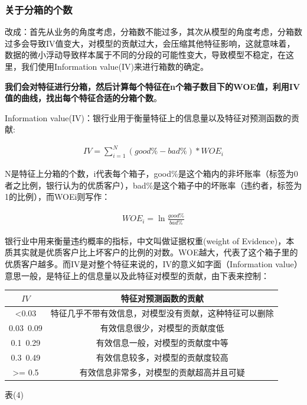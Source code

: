 \documentclass[12pt]{article}
\begin{document}
\subsubsection{关于分箱的个数}
\begin{flushleft}
	\noindent\qquad 改成：首先从业务的角度考虑，分箱数不能过多，其次从模型的角度考虑，分箱数过多会导致IV值变大，对模型的贡献过大，会压缩其他特征影响，这就意味着，数据的微小浮动导致样本属于不同的分段的可能性变大，导致模型不稳定，在这里，我们使用Information value(IV)来进行箱数的确定。\par
	\noindent\qquad \textbf{我们会对特征进行分箱，然后计算每个特征在n个箱子数目下的WOE值，利用IV值的曲线，找出每个特征合适的分箱个数}。\par
	\noindent\qquad Information value(IV)：银行业用于衡量特征上的信息量以及特征对预测函数的贡献:
	
\end{flushleft}
\begin{align}
IV=\sum_{i=1}^N (good\%-bad\%)*WOE_i\tag{1}
\end{align}

\begin{flushleft}
	\noindent\qquad N是特征上分箱的个数，i代表每个箱子，good$\%$是这个箱内的非坏账率（标签为0者之比例，银行认为的优质客户），bad$\%$是这个箱子中的坏账率（违约者，标签为1的比例），而WOEi则写作：
\end{flushleft}

\begin{align}\nonumber %
WOE_i=\ln\frac{good\%}{bad\%} \tag{2}
\end{align}

\begin{flushleft}
	\noindent\qquad 银行业中用来衡量违约概率的指标，中文叫做证据权重(weight of Evidence)，本质其实就是优质客户比上坏客户的比例的对数。WOE越大，代表了这个箱子里的优质客户越多。而IV是对整个特征来说的，IV的意义如字面（Information value）意思一般，是特征上的信息量以及此特征对模型的贡献，由下表来控制：
\end{flushleft}


\begin{tabular}{|c|c|}
	\hline 
	$IV$ & 特征对预测函数的贡献 \\ 
	\hline 
<0.03	& 特征几乎不带有效信息，对模型没有贡献，这种特征可以删除 \\ 
	\hline 
0.03~0.09	& 有效信息很少，对模型的贡献度低 \\ 
	\hline 
0.1~0.29		& 有效信息一般，对模型的贡献度中等 \\ 
	\hline 
0.3~0.49 	& 有效信息较多，对模型的贡献度较高\\ 
	\hline 
>= 0.5	& 有效信息非常多，对模型的贡献超高并且可疑 \\ 
	\hline 
\end{tabular}  
\begin{center}
	表(4)
\end{center}
\end{document}
